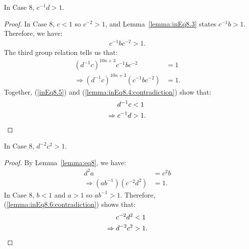 \begin{lemma} In Case 8, $c^{-1}d>1$.
\label{lemma:inEq8.4}
\end{lemma}
\begin{proof} In Case 8, $c<1$ so $c^{-2}>1$, and Lemma~\ref{lemma:inEq8.3} states $c^{-1}b>1$. Therefore, we have:
\begin{align}
c^{-1}bc^{-2}>1.\label{inEq8.5}
\end{align}
The third group relation tells us that:
\begin{align}
(d^{-1}c)^{10n+3}c^{-1}bc^{-2}&=1\nonumber{}\\
\Rightarrow{}(d^{-1}c)^{10n+3}(c^{-1}bc^{-2})&=1.\label{lemma:inEq8.4:contradiction}
\end{align}
Together, (\ref{inEq8.5}) and (\ref{lemma:inEq8.4:contradiction}) show that:
\begin{align*}
d^{-1}c&<1\\
\Rightarrow{}c^{-1}d&>1.\qedhere
\end{align*}
\end{proof}

\begin{lemma} In Case 8, $d^{-2}c^{2}>1$.
\label{lemma:inEq8.6} 
\end{lemma}
\begin{proof} By Lemma~\ref{lemma:eq8}, we have:
\begin{align}
d^{2}a&=c^{2}b\nonumber{}\\
\Rightarrow{}(ab^{-1})(c^{-2}d^{2})&=1.\label{lemma:inEq8.6:contradiction}
\end{align}
In Case 8, $b<1$ and $a>1$ so $ab^{-1}>1$. Therefore, (\ref{lemma:inEq8.6:contradiction}) shows that:
\begin{align*}
c^{-2}d^{2}&<1\\
\Rightarrow{}d^{-2}c^{2}&>1.\qedhere
\end{align*}
\end{proof}

